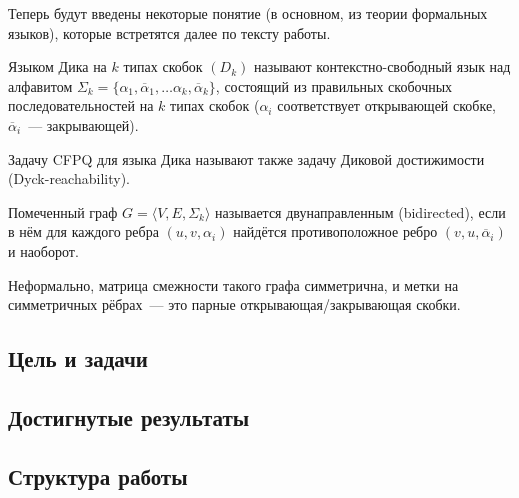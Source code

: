 Теперь будут введены некоторые понятие (в основном, из теории формальных языков), которые встретятся далее по тексту работы.

\begin{definition}
    Языком Дика на $k$ типах скобок $(D_k)$ называют контекстно-свободный язык над алфавитом $\Sigma_k = \{ \alpha_1, \overline{\alpha}_1, \dots \alpha_k, \overline{\alpha}_k \}$, состоящий из правильных скобочных последовательностей на $k$ типах скобок ($\alpha_i$ соответствует открывающей скобке, $\overline{\alpha}_i$~--- закрывающей).

    Задачу CFPQ для языка Дика называют также задачу Диковой достижимости (Dyck-reachability).
\end{definition}

\begin{definition}
    Помеченный граф $G = \langle V, E, \Sigma_k \rangle$ называется двунаправленным (bidirected), если в нём для каждого ребра $(u, v, \alpha_i)$ найдётся противоположное ребро $(v, u, \overline{\alpha}_i)$ и наоборот.

    Неформально, матрица смежности такого графа симметрична, и метки на симметричных рёбрах~--- это парные открывающая/закрывающая скобки.
\end{definition}

\begin{definition}

\end{definition}

\subsection*{Цель и задачи}

\subsection*{Достигнутые результаты}

\subsection*{Структура работы}